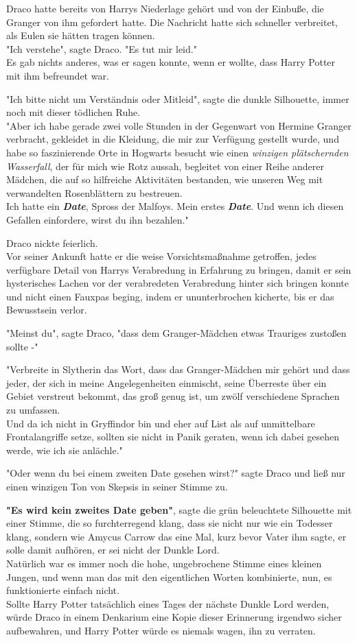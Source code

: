 {Draco hatte bereits von Harrys Niederlage gehört und von der Einbuße, die Granger von ihm gefordert hatte. Die Nachricht hatte sich schneller verbreitet, als Eulen sie hätten tragen können.\\ "Ich verstehe", sagte Draco. "Es tut mir leid."\\ Es gab nichts anderes, was er sagen konnte, wenn er wollte, dass Harry Potter mit ihm befreundet war.

"Ich bitte nicht um Verständnis oder Mitleid", sagte die dunkle Silhouette, immer noch mit dieser tödlichen Ruhe.\\ "Aber ich habe gerade zwei volle Stunden in der Gegenwart von Hermine Granger verbracht, gekleidet in die Kleidung, die mir zur Verfügung gestellt wurde, und habe so faszinierende Orte in Hogwarts besucht wie einen \emph{winzigen plätschernden Wasserfall}, der für mich wie Rotz aussah, begleitet von einer Reihe anderer Mädchen, die auf so hilfreiche Aktivitäten bestanden, wie unseren Weg mit verwandelten Rosenblättern zu bestreuen.\\ Ich hatte ein \textbf{\emph{Date}}, Spross der Malfoys. Mein erstes \textbf{\emph{Date}}. Und wenn ich diesen Gefallen einfordere, wirst du ihn bezahlen."

Draco nickte feierlich.\\ Vor seiner Ankunft hatte er die weise Vorsichtsmaßnahme getroffen, jedes verfügbare Detail von Harrys Verabredung in Erfahrung zu bringen, damit er sein hysterisches Lachen vor der verabredeten Verabredung hinter sich bringen konnte und nicht einen Fauxpas beging, indem er ununterbrochen kicherte, bis er das Bewusstsein verlor.

"Meinst du", sagte Draco, "dass dem Granger-Mädchen etwas Trauriges zustoßen sollte -"

"Verbreite in Slytherin das Wort, dass das Granger-Mädchen mir gehört und dass jeder, der sich in meine Angelegenheiten einmischt, seine Überreste über ein Gebiet verstreut bekommt, das groß genug ist, um zwölf verschiedene Sprachen zu umfassen.\\ Und da ich nicht in Gryffindor bin und eher auf List als auf unmittelbare Frontalangriffe setze, sollten sie nicht in Panik geraten, wenn ich dabei gesehen werde, wie ich sie anlächle."

"Oder wenn du bei einem zweiten Date gesehen wirst?" sagte Draco und ließ nur einen winzigen Ton von Skepsis in seiner Stimme zu.

\textbf{"Es wird kein zweites Date geben"}, sagte die grün beleuchtete Silhouette mit einer Stimme, die so furchterregend klang, dass sie nicht nur wie ein Todesser klang, sondern wie Amycus Carrow das eine Mal, kurz bevor Vater ihm sagte, er solle damit aufhören, er sei nicht der Dunkle Lord.\\ Natürlich war es immer noch die hohe, ungebrochene Stimme eines kleinen Jungen, und wenn man das mit den eigentlichen Worten kombinierte, nun, es funktionierte einfach nicht.\\ Sollte Harry Potter tatsächlich eines Tages der nächste Dunkle Lord werden, würde Draco in einem Denkarium eine Kopie dieser Erinnerung irgendwo sicher aufbewahren, und Harry Potter würde es niemals wagen, ihn zu verraten.

}
